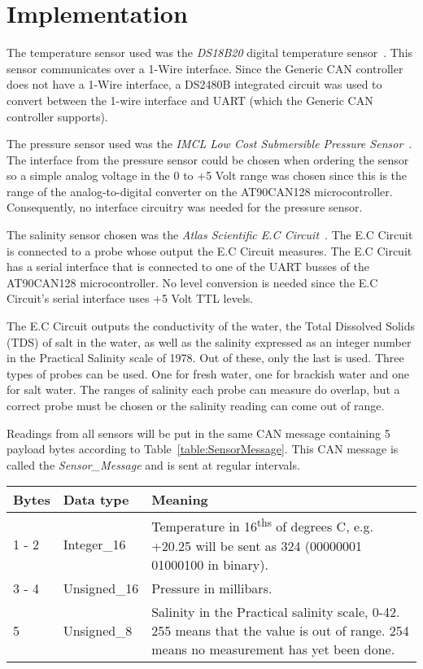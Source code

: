 
\section{Implementation}\label{sec:implementation}
The temperature sensor used was the \emph{DS18B20} digital temperature sensor~\cite{web:ds18b20}. This sensor communicates over a 1-Wire interface. Since the Generic CAN controller does not have a 1-Wire interface, a DS2480B integrated circuit was used to convert between the 1-wire interface and UART (which the Generic CAN controller supports).

The pressure sensor used was the \emph{IMCL Low Cost Submersible Pressure Sensor}~\cite{web:imcl}. The interface from the pressure sensor could be chosen when ordering the sensor so a simple analog voltage in the 0 to +5 Volt range was chosen since this is the range of the analog-to-digital converter on the AT90CAN128 microcontroller. Consequently, no interface circuitry was needed for the pressure sensor.

The salinity sensor chosen was the \emph{Atlas Scientific E.C Circuit}~\cite{web:ec_circuit}. The E.C Circuit is connected to a probe whose output the E.C Circuit measures. The E.C Circuit has a serial interface that is connected to one of the UART busses of the AT90CAN128 microcontroller. No level conversion is needed since the E.C Circuit's serial interface uses +5 Volt TTL levels.

The E.C Circuit outputs the conductivity of the water, the Total Dissolved Solids (TDS) of salt in the water, as well as the salinity expressed as an integer number in the Practical Salinity scale of 1978. Out of these, only the last is used. \newline
Three types of probes can be used. One for fresh water, one for brackish water and one for salt water. The ranges of salinity each probe can measure do overlap, but a correct probe must be chosen or the salinity reading can come out of range. 

Readings from all sensors will be put in the same CAN message containing 5 payload bytes according to Table~\ref{table:SensorMessage}. This CAN message is called the \emph{Sensor\_Message} and is sent at regular intervals.

\begin{table*}
\centering
    \caption{Payload bytes of the Sensor CAN message}
    \begin{tabular}{|l|l|p{11cm}|} \hline
    \label{table:SensorMessage}
    	\textbf{Bytes} & \textbf{Data type} & \textbf{Meaning} \\ \hline
        1 - 2 & Integer\_16 & Temperature in 16\textsuperscript{ths} of degrees C, e.g. +20.25 will be sent as 324 \newline 
        (00000001 01000100 in binary). \\ \hline
        3 - 4 & Unsigned\_16 & Pressure in millibars. \\ \hline
        5  & Unsigned\_8 & Salinity in the Practical salinity scale, 0-42. 255 means that the value is out of range. 254 means no measurement has yet been done. \\ \hline
    \end{tabular}
\end{table*}

